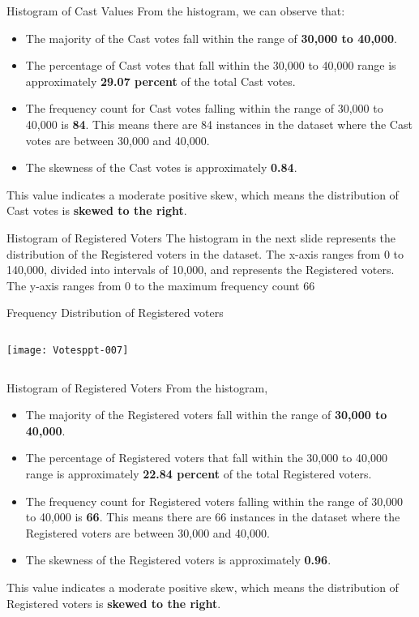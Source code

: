 \documentclass{beamer}
\begin{document}
\begin{frame}{Histogram of Cast Values}
From the histogram, we can observe that:
\begin{itemize}
\item The majority of the Cast votes fall within the range of \textbf{30,000 to 40,000}.
\item The percentage of Cast votes that fall within the 30,000 to 40,000 range is approximately \textbf{29.07 percent} of the total Cast votes.
\item The frequency count for Cast votes falling within the range of 30,000 to 40,000 is \textbf{84}. This means there are 84 instances in the dataset where the Cast votes are between 30,000 and 40,000.
\item The skewness of the Cast votes is approximately \textbf{0.84}.
\end{itemize}
This value indicates a moderate positive skew, which means the distribution of Cast votes is \textbf{skewed to the right}.
\end{frame}

\begin{frame}[fragile]{Histogram of Registered Voters}
The histogram in the next slide represents the distribution of the Registered voters in the dataset. The x-axis ranges from 0 to 140,000, divided into intervals of 10,000, and represents the Registered voters. The y-axis ranges from 0 to the maximum frequency count 66
\end{frame}

\begin{frame}[fragile]{Frequency Distribution of Registered voters}
\begin{columns}[c] %
\texttt{[image: Votesppt-007]}
\end{columns}
\end{frame}

\begin{frame}{Histogram of Registered Voters}
From the histogram, 
\begin{itemize}
\item The majority of the Registered voters fall within the range of \textbf{30,000 to 40,000}.
\item The percentage of Registered voters that fall within the 30,000 to 40,000 range is approximately \textbf{22.84 percent} of the total Registered voters.
\item The frequency count for Registered voters falling within the range of 30,000 to 40,000 is \textbf{66}. This means there are 66 instances in the dataset where the Registered voters are between 30,000 and 40,000.
\item The skewness of the Registered voters is approximately \textbf{0.96}.
\end{itemize}
This value indicates a moderate positive skew, which means the distribution of Registered voters is \textbf{skewed to the right}.
\end{frame}
\end{document}
